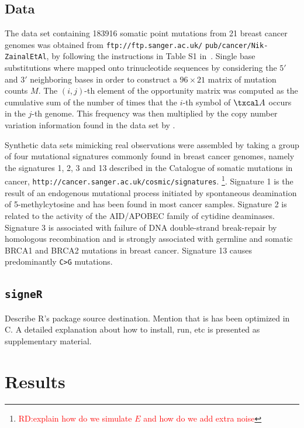 \documentclass{bioinfo}
\newcommand{\CC}{C\nolinebreak\hspace{-.05em}\raisebox{.4ex}{\tiny\bf
    +}\nolinebreak\hspace{-.10em}\raisebox{.4ex}{\tiny\bf +}}
\begin{document}
\subsection{Data} The data set containing 183916 somatic point
mutations from 21 breast cancer genomes was obtained from
\verb+ftp://ftp.sanger.ac.uk/+ \verb+pub/cancer/Nik-ZainalEtAl+, by
following the instructions in Table S1 in~\cite{NCell}. Single base 
substitutions where mapped onto trinucleotide sequences by considering
the $5'$ and $3'$ neighboring bases in order to construct a $96\times
21$ matrix of mutation counts $M$. 
The $(i,j)$-th element of the opportunity matrix was computed as the
cumulative sum of the number of times that the $i$-th symbol of
$\txcal A$ occurs in the $j$-th genome. This frequency was then
multiplied by the copy number variation information found in the data 
set by \cite{NCell}.


Synthetic data sets mimicking real observations were assembled by
taking a group of four mutational signatures commonly found in 
breast cancer genomes, namely the signatures 1, 2, 3 and 13 described   
in the Catalogue  of somatic  mutations in cancer,
\verb~http://cancer.sanger.ac.uk/cosmic/signatures~.
\footnote{\textcolor{red}{RD:explain how do we simulate $E$ and how do
    we add extra noise}}. 
Signature 1 is the result of an endogenous mutational process
initiated by spontaneous deamination of 5-methylcytosine and has been
found in most cancer samples. Signature 2 is related to the activity
of the AID/APOBEC family of cytidine deaminases. Signature 3 is
associated with failure of DNA double-strand break-repair by
homologous recombination and is strongly associated with
germline and somatic BRCA1 and BRCA2 mutations in breast cancer.
Signature 13 causes predominantly \texttt{C>G} mutations.


\subsection{\texttt{signeR}} Describe R's package 
source destination. Mention that is has been optimized in
\CC. A detailed explanation about how to install, run, etc is 
presented as supplementary material.

\section{Results}
\end{document}
